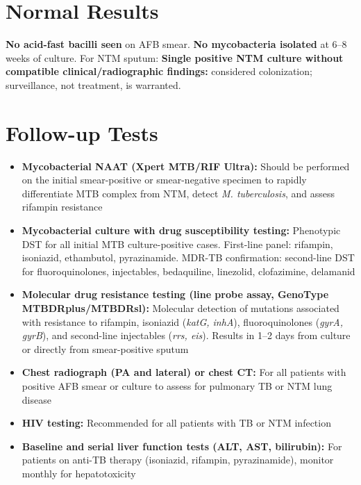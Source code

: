 \section*{Normal Results}
\textbf{No acid-fast bacilli seen} on AFB smear. \textbf{No mycobacteria isolated} at 6--8 weeks of culture. For NTM sputum: \textbf{Single positive NTM culture without compatible clinical/radiographic findings:} considered colonization; surveillance, not treatment, is warranted.

\section*{Follow-up Tests}
\begin{itemize}
  \item \textbf{Mycobacterial NAAT (Xpert MTB/RIF Ultra):} Should be performed on the initial smear-positive or smear-negative specimen to rapidly differentiate MTB complex from NTM, detect \textit{M. tuberculosis}, and assess rifampin resistance
  \item \textbf{Mycobacterial culture with drug susceptibility testing:} Phenotypic DST for all initial MTB culture-positive cases. First-line panel: rifampin, isoniazid, ethambutol, pyrazinamide. MDR-TB confirmation: second-line DST for fluoroquinolones, injectables, bedaquiline, linezolid, clofazimine, delamanid
  \item \textbf{Molecular drug resistance testing (line probe assay, GenoType MTBDRplus/MTBDRsl):} Molecular detection of mutations associated with resistance to rifampin, isoniazid (\textit{katG, inhA}), fluoroquinolones (\textit{gyrA, gyrB}), and second-line injectables (\textit{rrs, eis}). Results in 1--2 days from culture or directly from smear-positive sputum
  \item \textbf{Chest radiograph (PA and lateral) or chest CT:} For all patients with positive AFB smear or culture to assess for pulmonary TB or NTM lung disease
  \item \textbf{HIV testing:} Recommended for all patients with TB or NTM infection
  \item \textbf{Baseline and serial liver function tests (ALT, AST, bilirubin):} For patients on anti-TB therapy (isoniazid, rifampin, pyrazinamide), monitor monthly for hepatotoxicity
\end{itemize}

